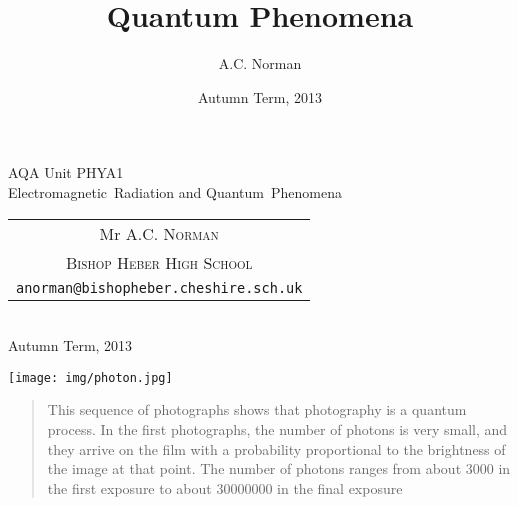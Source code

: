 \documentclass[a4paper,nohyper,12pt]{tufte-book}
\title{Quantum Phenomena}
\author{A.C. Norman}
\date{Autumn Term, 2013}
\begin{document}
\begin{titlepage}

\begin{fullwidth}

  \begin{center}
\vfill
    {\fontsize{32}{36}\selectfont AQA Unit PHYA1\\Electromagnetic~Radiation and Quantum~Phenomena \\}
    \vspace*{2em}
            {\LARGE
              \vspace{.75em}
              \begin{tabular}[t]{c}
                Mr \textsc{A.C. Norman}\\
                \textsc{Bishop Heber High School}\\ 
                \texttt{anorman@bishopheber.cheshire.sch.uk}
            \end{tabular}}\\
            \vspace{1.5em}
                   {\Large Autumn Term, 2013}
  \end{center}
  
\thispagestyle{empty}

\vfill

\begin{center}
\noindent\texttt{[image: img/photon.jpg]}

\footnotesize
\begin{quotation}
This sequence of photographs shows that photography is a quantum process. In the first photographs, the number of photons is very small, and they arrive on the film with a probability proportional to the brightness of the image at that point. The number of photons ranges from about \num{3000} in the first exposure to about \num{30000000} in the final exposure 
\end{quotation}
\begin{flushright}
\end{flushright}
\end{center}

\vfill

\end{fullwidth}

\normalsize

\end{titlepage}
\newpage

\thispagestyle{empty}
\addtocounter{page}{-2}
\end{document}
